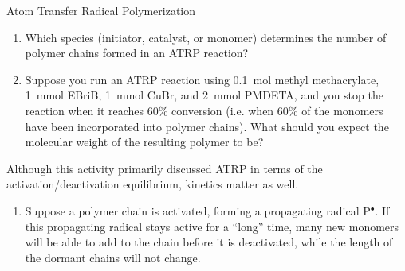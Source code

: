 \begin{activity}{Atom Transfer Radical Polymerization}
\begin{exercises}
	\exercise 
	
		\begin{enumerate}
	
			\item Which species (initiator, catalyst, or monomer) determines the number of polymer chains formed in an ATRP reaction?
		
		\begin{solution}\end{solution}
	
			\item Suppose you run an ATRP reaction using 0.1~mol methyl methacrylate, 1~mmol EBriB, 1~mmol CuBr, and 2~mmol PMDETA, and you stop the reaction when it reaches 60\% conversion (i.e. when 60\% of the monomers have been incorporated into polymer chains).  What should you expect the molecular weight of the resulting polymer to be?
		
		\begin{solution}\end{solution}
			
		\end{enumerate}
		
	\exercise Although this activity primarily discussed ATRP in terms of the activation/deactivation equilibrium, kinetics matter as well. \label{\labelbase:exc:kinetics}
	
		\begin{enumerate}
			\item Suppose a polymer chain is activated, forming a propagating radical P$^\bullet$.  If this propagating radical stays active for a ``long'' time, many new monomers will be able to add to the chain before it is deactivated, while the length of the dormant chains will not change.
			

\end{enumerate}
\end{exercises}
\end{activity}
